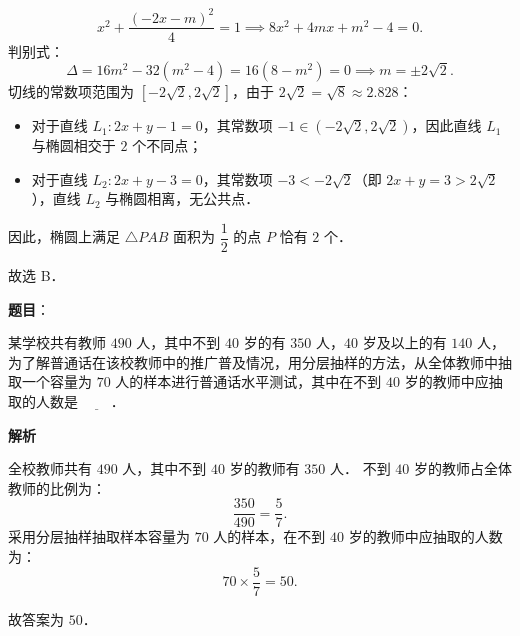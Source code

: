 \begin{answer}
\nopagebreak[4]
\[
x^2 + \dfrac{(-2x-m)^2}{4} = 1 \implies 8x^2 + 4mx + m^2 - 4 = 0.
\]
判别式：
\nopagebreak[4]
\[
\Delta = 16m^2 - 32(m^2 - 4) = 16(8 - m^2) = 0 \implies m = \pm 2\sqrt{2}.
\]
切线的常数项范围为 $[-2\sqrt{2}, 2\sqrt{2}]$，由于 $2\sqrt{2} = \sqrt{8} \approx 2.828$：
\begin{itemize}
\item 对于直线 $L_1: 2x + y - 1 = 0$，其常数项 $-1 \in (-2\sqrt{2}, 2\sqrt{2})$，因此直线 $L_1$ 与椭圆相交于 $2$ 个不同点；
\item 对于直线 $L_2: 2x + y - 3 = 0$，其常数项 $-3 < -2\sqrt{2}$（即 $2x+y=3 > 2\sqrt{2}$），直线 $L_2$ 与椭圆相离，无公共点．
\end{itemize}
因此，椭圆上满足 $\triangle PAB$ 面积为 $\dfrac{1}{2}$ 的点 $P$ 恰有 $2$ 个．

故选 B．


\end{answer}
\begin{answer}

\textbf{题目}：

某学校共有教师 $490$ 人，其中不到 $40$ 岁的有 $350$ 人，$40$ 岁及以上的有 $140$ 人，为了解普通话在该校教师中的推广普及情况，用分层抽样的方法，从全体教师中抽取一个容量为 $70$ 人的样本进行普通话水平测试，其中在不到 $40$ 岁的教师中应抽取的人数是 $\underline{\hspace{2em}}$．

\textbf{解析}

全校教师共有 $490$ 人，其中不到 $40$ 岁的教师有 $350$ 人．
不到 $40$ 岁的教师占全体教师的比例为：
\nopagebreak[4]
\[
\dfrac{350}{490} = \dfrac{5}{7}.
\]
采用分层抽样抽取样本容量为 $70$ 人的样本，在不到 $40$ 岁的教师中应抽取的人数为：
\nopagebreak[4]
\[
70 \times \dfrac{5}{7} = 50.
\]

故答案为 $50$．


\end{answer}
